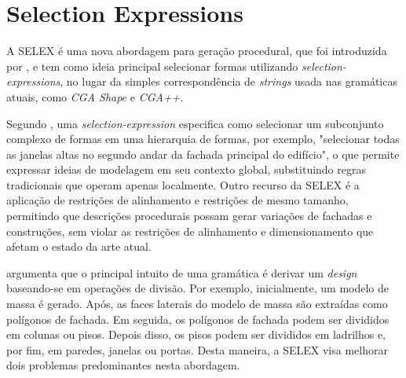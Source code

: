 \begin{figure}[h!]
	\centering
	\captionsetup{width=14cm}
	{}
\end{figure}

\newpage

\section{Selection Expressions}
\label{sec:selex}

A \gls{SELEX} é uma nova abordagem para geração procedural, que foi introduzida por , e tem como ideia principal selecionar formas utilizando \textit{selection-expressions}, no lugar da simples correspondência de \textit{strings} usada nas gramáticas atuais, como \textit{CGA Shape} e \textit{CGA++}. 

Segundo , uma \textit{selection-expression} especifica como selecionar um subconjunto complexo de formas em uma hierarquia de formas, por exemplo, "selecionar todas as janelas altas no segundo andar da fachada principal do edifício", o que permite expressar ideias de modelagem em seu contexto global, substituindo regras tradicionais que operam apenas localmente. Outro recurso da \gls{SELEX} é a aplicação de restrições de alinhamento e restrições de mesmo tamanho, permitindo que descrições procedurais possam gerar variações de fachadas e construções, sem violar as restrições de alinhamento e dimensionamento que afetam o estado da arte atual.

 argumenta que o principal intuito de uma gramática é derivar um \textit{design} baseando-se em operações de divisão. Por exemplo, inicialmente, um modelo de massa é gerado. Após, as faces laterais do modelo de massa são extraídas como polígonos de fachada. Em seguida, os polígonos de fachada podem ser divididos em colunas ou pisos. Depois disso, os pisos podem ser divididos em ladrilhos e, por fim, em paredes, janelas ou portas. Desta maneira, a \gls{SELEX} visa melhorar dois problemas predominantes nesta abordagem.

